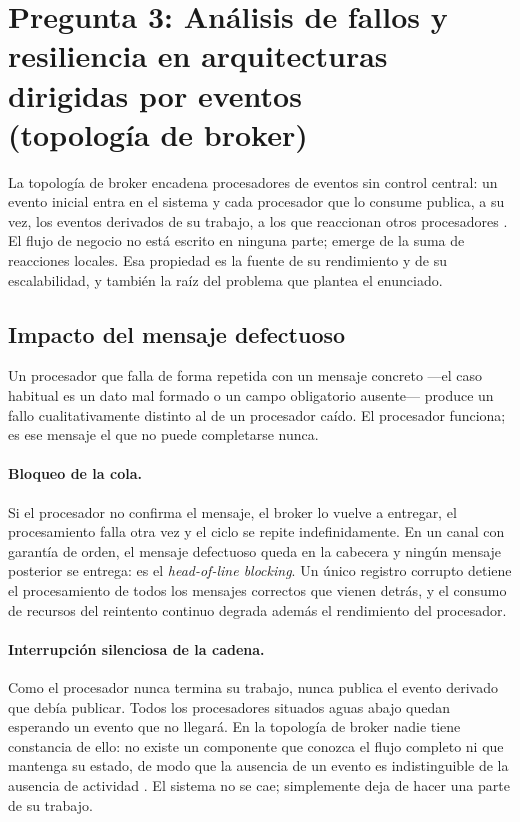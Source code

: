 \section[Pregunta 3: Fallos y resiliencia en EDA]{Pregunta 3: Análisis de fallos y resiliencia en arquitecturas dirigidas por eventos\\(topología de broker)}


La topología de broker encadena procesadores de eventos sin control central: un evento inicial entra en el sistema y cada procesador que lo consume publica, a su vez, los eventos derivados de su trabajo, a los que reaccionan otros procesadores \parencite{richardsford2020}. El flujo de negocio no está escrito en ninguna parte; emerge de la suma de reacciones locales. Esa propiedad es la fuente de su rendimiento y de su escalabilidad, y también la raíz del problema que plantea el enunciado.

\subsection{Impacto del mensaje defectuoso}

Un procesador que falla de forma repetida con un mensaje concreto ---el caso habitual es un dato mal formado o un campo obligatorio ausente--- produce un fallo cualitativamente distinto al de un procesador caído. El procesador funciona; es ese mensaje el que no puede completarse nunca.

\paragraph{Bloqueo de la cola.} Si el procesador no confirma el mensaje, el broker lo vuelve a entregar, el procesamiento falla otra vez y el ciclo se repite indefinidamente. En un canal con garantía de orden, el mensaje defectuoso queda en la cabecera y ningún mensaje posterior se entrega: es el \emph{head-of-line blocking}. Un único registro corrupto detiene el procesamiento de todos los mensajes correctos que vienen detrás, y el consumo de recursos del reintento continuo degrada además el rendimiento del procesador.

\paragraph{Interrupción silenciosa de la cadena.} Como el procesador nunca termina su trabajo, nunca publica el evento derivado que debía publicar. Todos los procesadores situados aguas abajo quedan esperando un evento que no llegará. En la topología de broker nadie tiene constancia de ello: no existe un componente que conozca el flujo completo ni que mantenga su estado, de modo que la ausencia de un evento es indistinguible de la ausencia de actividad \parencite{richardsford2020}. El sistema no se cae; simplemente deja de hacer una parte de su trabajo.

